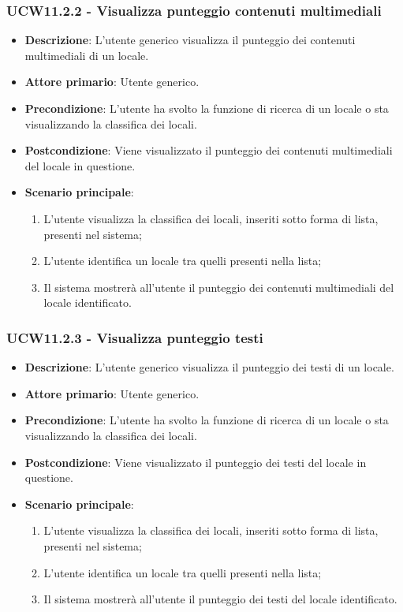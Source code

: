 \subsubsection{UCW11.2.2 - Visualizza punteggio contenuti multimediali}
\begin{itemize}
    \item \textbf{Descrizione}: L'utente generico visualizza il punteggio dei contenuti multimediali di un locale.
    \item \textbf{Attore primario}: Utente generico.
    \item \textbf{Precondizione}: L'utente ha svolto la funzione di ricerca di un locale o sta visualizzando la classifica dei locali.
    \item \textbf{Postcondizione}: Viene visualizzato il punteggio dei contenuti multimediali del locale in questione.
    \item \textbf{Scenario principale}: 
    \begin{enumerate}
        \item L'utente visualizza la classifica dei locali, inseriti sotto forma di lista, presenti nel sistema;
        \item L'utente identifica un locale tra quelli presenti nella lista;
        \item Il sistema mostrerà all'utente il punteggio dei contenuti multimediali del locale identificato.
        \end{enumerate}
\end{itemize}
\subsubsection{UCW11.2.3 - Visualizza punteggio testi}
\begin{itemize}
    \item \textbf{Descrizione}: L'utente generico visualizza il punteggio dei testi di un locale.
    \item \textbf{Attore primario}: Utente generico.
    \item \textbf{Precondizione}: L'utente ha svolto la funzione di ricerca di un locale o sta visualizzando la classifica dei locali.
    \item \textbf{Postcondizione}: Viene visualizzato il punteggio dei testi del locale in questione.
    \item \textbf{Scenario principale}: 
    \begin{enumerate}
        \item L'utente visualizza la classifica dei locali, inseriti sotto forma di lista, presenti nel sistema;
        \item L'utente identifica un locale tra quelli presenti nella lista;
        \item Il sistema mostrerà all'utente il punteggio dei testi del locale identificato.
        \end{enumerate}
\end{itemize}

